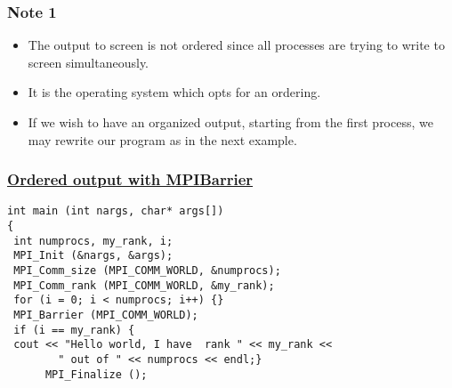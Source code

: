 \documentclass{beamer}
\begin{document}
\begin{frame}
\frametitle{Note 1}

\begin{block}{}

\begin{itemize}
\item The output to screen is not ordered since all processes are trying to write  to screen simultaneously.

\item It is the operating system which opts for an ordering.  

\item If we wish to have an organized output, starting from the first process, we may rewrite our program as in the next example.
\end{itemize}

\noindent
\end{block}
\end{frame}

\begin{frame}
\frametitle{\href{{https://github.com/CompPhysics/ComputationalPhysics2/blob/gh-pages/doc/Programs/LecturePrograms/programs/MPI/chapter07/program3.cpp}}{Ordered output with MPIBarrier}}

\begin{block}{}














\begin{verbatim}
int main (int nargs, char* args[])
{
 int numprocs, my_rank, i;
 MPI_Init (&nargs, &args);
 MPI_Comm_size (MPI_COMM_WORLD, &numprocs);
 MPI_Comm_rank (MPI_COMM_WORLD, &my_rank);
 for (i = 0; i < numprocs; i++) {}
 MPI_Barrier (MPI_COMM_WORLD);
 if (i == my_rank) {
 cout << "Hello world, I have  rank " << my_rank << 
        " out of " << numprocs << endl;}
      MPI_Finalize ();

\end{verbatim}


\end{block}
\end{frame}
\end{document}
